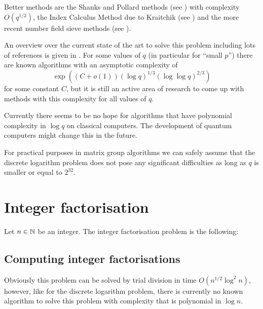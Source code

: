 Better methods are the Shanks and Pollard methods (see 
\cite[Section~3]{odlyzkodlp}) with complexity $O(q^{1/2})$, 
the Index Calculus Method due to
Kraitchik (see \cite{McCurley}) and the more recent number field sieve
methods (see \cite[Section~4]{odlyzkodlp}).

An overview over the current state of the art to solve this problem
including lots of references
is given in \cite{odlyzkodlp}. For some values of $q$ (in particular
for ``small $p$'') there are known
algorithms with an asymptotic complexity of
\[ \exp( (C+o(1)) (\log q)^{1/3} (\log \log q)^{2/3} ) \]
for some constant $C$,
but it is still an active area of research to come up with methods
with this complexity for all values of $q$.

Currently there seems to be no hope for algorithms that have
polynomial complexity in $\log q$ on classical computers. The development
of quantum computers might change this in the future.

For practical purposes in matrix group algorithms 
we can safely assume that the discrete logarithm
problem does not pose any significant difficulties as long as $q$ is
smaller or equal to $2^{32}$.

\section{Integer factorisation}
\label{intfact}

\begin{Problem}
    Let $n \in \mathbb{N}$ be an integer.
    The integer factorisation problem is the following:

    \begin{center}
\end{center}
\end{Problem}

\subsection{Computing integer factorisations}

Obviously this problem can be solved by trial division in time
$O(n^{1/2} \log^2 n)$, however, like for the discrete logarithm problem, 
there is currently no known
algorithm to solve this problem with complexity that is polynomial
in $\log n$.

